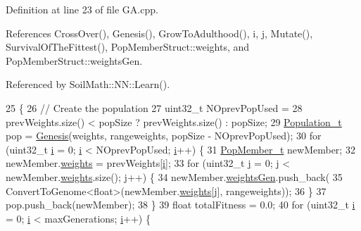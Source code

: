 Definition at line 23 of file G\+A.\+cpp.



References Cross\+Over(), Genesis(), Grow\+To\+Adulthood(), i, j, Mutate(), Survival\+Of\+The\+Fittest(), Pop\+Member\+Struct\+::weights, and Pop\+Member\+Struct\+::weights\+Gen.



Referenced by Soil\+Math\+::\+N\+N\+::\+Learn().


\begin{DoxyCode}
25                                                                            \{
26   \textcolor{comment}{// Create the population}
27   uint32\_t NOprevPopUsed =
28       prevWeights.size() < popSize ? prevWeights.size() : popSize;
29   \hyperlink{_soil_math_types_8h_a8d2d4c736cf817d048a2d66dec8b12ec}{Population\_t} pop = \hyperlink{class_soil_math_1_1_g_a_a96cfe7cc5b3028a66b0136e72ea38cbc}{Genesis}(weights, rangeweights, popSize - NOprevPopUsed);
30   \textcolor{keywordflow}{for} (uint32\_t \hyperlink{_comparision_pictures_2_createtest_image_8m_a6f6ccfcf58b31cb6412107d9d5281426}{i} = 0; \hyperlink{_comparision_pictures_2_createtest_image_8m_a6f6ccfcf58b31cb6412107d9d5281426}{i} < NOprevPopUsed; \hyperlink{_comparision_pictures_2_createtest_image_8m_a6f6ccfcf58b31cb6412107d9d5281426}{i}++) \{
31     \hyperlink{struct_pop_member_struct}{PopMember\_t} newMember;
32     newMember.\hyperlink{struct_pop_member_struct_aeba960170ef60a906c730cc24cd90367}{weights} = prevWeights[\hyperlink{_comparision_pictures_2_createtest_image_8m_a6f6ccfcf58b31cb6412107d9d5281426}{i}];
33     \textcolor{keywordflow}{for} (uint32\_t \hyperlink{_comparision_pictures_2_createtest_image_8m_ac86694252f8dfdb19aaeadc4b7c342c6}{j} = 0; \hyperlink{_comparision_pictures_2_createtest_image_8m_ac86694252f8dfdb19aaeadc4b7c342c6}{j} < newMember.\hyperlink{struct_pop_member_struct_aeba960170ef60a906c730cc24cd90367}{weights}.size(); \hyperlink{_comparision_pictures_2_createtest_image_8m_ac86694252f8dfdb19aaeadc4b7c342c6}{j}++) \{
34       newMember.\hyperlink{struct_pop_member_struct_a072fadb4863e0cf77b55ad3b46b62522}{weightsGen}.push\_back(
35           ConvertToGenome<float>(newMember.\hyperlink{struct_pop_member_struct_aeba960170ef60a906c730cc24cd90367}{weights}[\hyperlink{_comparision_pictures_2_createtest_image_8m_ac86694252f8dfdb19aaeadc4b7c342c6}{j}], rangeweights));
36     \}
37     pop.push\_back(newMember);
38   \}
39   \textcolor{keywordtype}{float} totalFitness = 0.0;
40   \textcolor{keywordflow}{for} (uint32\_t \hyperlink{_comparision_pictures_2_createtest_image_8m_a6f6ccfcf58b31cb6412107d9d5281426}{i} = 0; \hyperlink{_comparision_pictures_2_createtest_image_8m_a6f6ccfcf58b31cb6412107d9d5281426}{i} < maxGenerations; \hyperlink{_comparision_pictures_2_createtest_image_8m_a6f6ccfcf58b31cb6412107d9d5281426}{i}++) \{

\end{DoxyCode}
